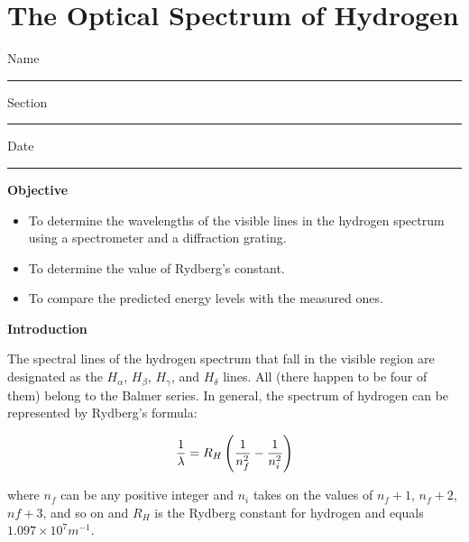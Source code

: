 
\setcounter{equation}{0}
\setcounter{figure}{0}

\section{The Optical Spectrum of Hydrogen}

Name \rule{2.0in}{0.1pt}\hfill{}Section \rule{1.0in}{0.1pt}\hfill{}Date
\rule{1.0in}{0.1pt}


\textbf{Objective}

\begin{itemize}

\item To determine the wavelengths of the visible lines in the hydrogen spectrum using         
a spectrometer and a diffraction grating.

\item To determine the value of Rydberg's constant.

\item To compare the predicted energy levels with the measured ones.

\end{itemize}

\textbf{Introduction}

\bigskip
 
The spectral lines of the hydrogen spectrum that fall in the visible region are designated as 
the $H_\alpha$, 
$H_\beta$, $H_\gamma$, and $H_\delta$  lines.  
All (there happen to be four of them) belong to the Balmer series.  
In general, the spectrum of hydrogen can be represented by Rydberg's formula:

\begin{equation}
{1 \over \lambda} = R_H \left ( {1 \over n_f^2} - {1 \over n_i^2} \right )
\end{equation}

\noindent where $n_f$ can be any positive integer and $n_i$ 
takes on the values of $n_f + 1$, $n_f + 2$, 
$nf + 3$, and so on and $R_H$ is the Rydberg constant 
for hydrogen and equals $1.097 \times 10^7 m^{-1}$.


